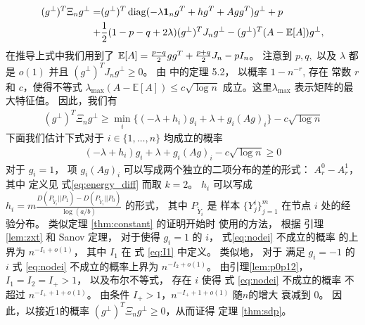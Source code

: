 \begin{align*}
    (g^{\perp})^T \Xi_n g^{\perp} 
    =& (g^{\perp})^T \operatorname{diag}( -\lambda \mathbf{1}_ng^T+hg^T + Agg^T) g^{\perp} + p \\
    +& \frac{1}{2}(1-p-q+2\lambda)(g^{\perp})^TJ_n g^{\perp}
    -(g^{\perp})^T(A-\operatorname{\mathbb{E}}[A])g^{\perp},
\end{align*}
在推导上式中我们用到了 $\operatorname{\mathbb{E}}[A] = \frac{p-q}{2}gg^T + \frac{p+q}{2}J_n - pI_n$。
注意到 $p,q,$ 以及 $\lambda$ 都是 $o(1)$ 并且
$(g^{\perp})^TJ_n g^{\perp}\ge 0$。
由 \citet{lei2015consistency} 中的定理 5.2，
以概率 $1-n^{-r}$, 存在
常数 $r$ 和 $c$，使得不等式 $\lambda_{\max}(A-\mathbb{E}[A]) \leq c\sqrt{\log n}$
成立。这里$\lambda_{\max}$ 表示矩阵的最大特征值。
因此，我们有
\begin{align}\label{eq:lastterm}
    (g^{\perp})^T \Xi_n g^{\perp} \geq \min_i\{(-\lambda + h_i) g_i+\lambda + g_i (Ag)_i \} - c \sqrt{\log n}
\end{align}
下面我们估计下式对于 $i\in\{1,\ldots,n\}$ 均成立的概率
\begin{align}\label{eq:nodei}
    (-\lambda + h_i) g_i+\lambda + g_i (Ag)_i  - c \sqrt{\log n}\ge 0
\end{align}
对于 $g_i=1$，
项 $g_i(Ag)_i$ 可以写成两个独立的二项分布的差的形式：
$A_r^0-A_r^1$，其中 定义见 式\eqref{eq:energy_diff} 而取 $k=2$。
$h_i$ 可以写成 $h_i=m \frac{D(P_{\widetilde{Y}_i} || P_1) - D(P_{\widetilde{Y}_i} || P_0) }{\log (a /b)}$
的形式，
其中 $P_{\widetilde{Y}_i}$ 是
样本 $\{Y^i_j\}^m_{j=1}$ 在节点 $i$ 处的经验分布。
类似定理 \ref{thm:constant} 的证明开始时
使用的方法，
根据 引理 \ref{lem:zxt}  和  Sanov 定理，
对于使得 $g_i=1$ 的 $i$， 
式\eqref{eq:nodei} 不成立的概率
的上界为
$n^{-I_1 + o(1)}$，
其中 $I_1$ 在 式 \eqref{eq:I1} 中定义。
类似地，
对于 满足 $g_i=-1$ 的  $i$
式 \eqref{eq:nodei} 不成立的概率上界为 
$n^{-I_2 + o(1)}$。
由引理\ref{lem:p0p12}，$I_1=I_2=I_+>1$，
以及布尔不等式，  存在 $i$ 使得 式 \eqref{eq:nodei} 不成立的概率 不超过 $n^{-I_+ + 1 + o(1)}$。
由条件 $I_+>1$，$n^{-I_+ + 1 + o(1)}$ 随$n$的增大 衰减到 $0$。
 因此，以接近1的概率 $(g^{\perp})^T \Xi_n g^{\perp}\ge 0$，从而证得 定理 \ref{thm:sdp}。 


